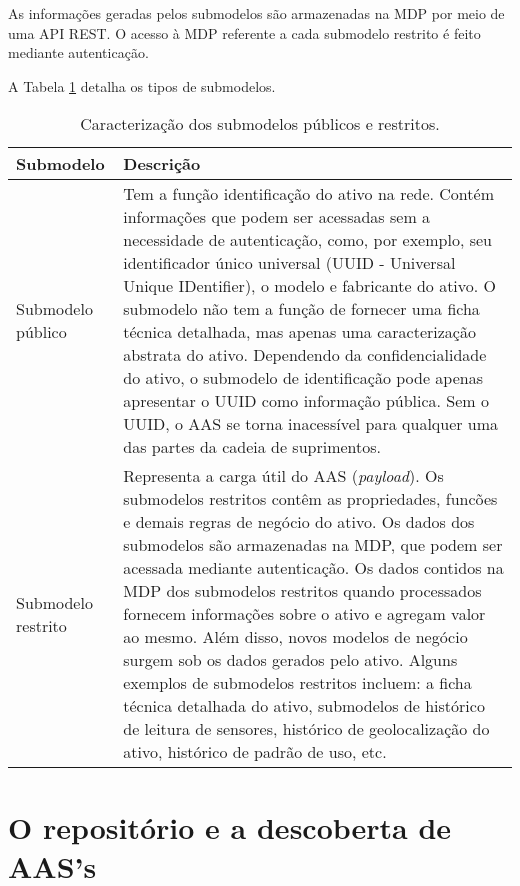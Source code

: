 	As informações geradas pelos submodelos são armazenadas na MDP por meio de uma API REST. O acesso à MDP referente a cada submodelo restrito é feito mediante autenticação.
	
	A Tabela \ref{tab:submodelos-publicos-restritos} detalha os tipos de submodelos.
	
	
		\begin{table}[H]
		\centering
		\caption{Caracterização dos submodelos públicos e restritos.}
		\begin{tabular}{|p{1.3in}|p{4in}|}
			
			\hline
			\textbf{Submodelo}
			&\textbf{Descrição} \\
			
			\hline
			Submodelo público
			& Tem a função identificação do ativo na rede. Contém informações que podem ser acessadas sem a necessidade de autenticação, como, por exemplo, seu identificador único universal (UUID - Universal Unique IDentifier), o modelo e fabricante do ativo. O submodelo não tem a função de fornecer uma ficha técnica detalhada, mas apenas uma caracterização abstrata do ativo. Dependendo da confidencialidade do ativo, o submodelo de identificação pode apenas apresentar o UUID como informação pública. Sem o UUID, o AAS se torna inacessível para qualquer uma das partes da cadeia de suprimentos. \\
			
			\hline
			Submodelo restrito
			& Representa a carga útil do AAS (\textit{payload}). Os submodelos restritos contêm as propriedades, funcões e demais regras de negócio do ativo. Os dados dos submodelos são armazenadas na MDP, que podem ser acessada mediante autenticação. Os dados contidos na MDP dos submodelos restritos quando processados fornecem informações sobre o ativo e agregam valor ao mesmo. Além disso, novos modelos de negócio surgem sob os dados gerados pelo ativo. Alguns exemplos de submodelos restritos incluem: a ficha técnica detalhada do ativo, submodelos de histórico de leitura de sensores, histórico de geolocalização do ativo, histórico de padrão de uso, etc.\\
			
		
			\hline
			
		\end{tabular}
		\label{tab:submodelos-publicos-restritos}
	\end{table}
	
\section{O repositório e a descoberta de AAS's}
	
